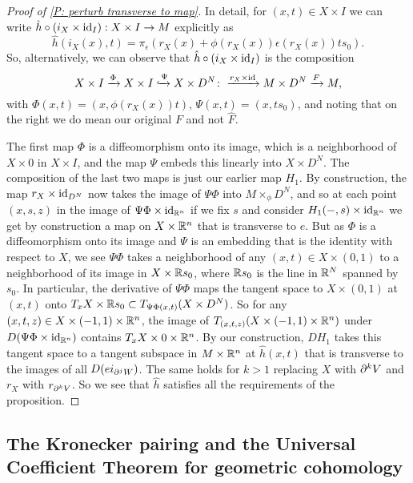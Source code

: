 \begin{proof}[Proof of \cref{P: perturb transverse to map}]
In detail, for $(x,t) \in X \times I$ we can write $\hat h \circ (i_X \times \mathrm{id}_I):X \times I \to M$ explicitly as
$$\hat h(i_X(x),t) = \pi_\epsilon(r_X(x)+\phi(r_X(x))\epsilon(r_X(x))ts_0).$$
So, alternatively, we can observe that $\hat h \circ (i_X \times \mathrm{id}_I)$ is the composition
\begin{equation}\label{E: alt hat g}
X \times I \xrightarrow{\Phi} X \times I \xhookrightarrow{\Psi} X \times D^N\colon\xrightarrow{r_X \times \mathrm{id}} M \times D^N \xrightarrow{F} M,
\end{equation}
with $\Phi(x,t) = (x,\phi(r_X(x))t)$, $\Psi(x,t) = (x,ts_0)$, and noting that on the right we do mean our original $F$ and not $\hat F$.

The first map $\Phi$ is a diffeomorphism onto its image, which is a neighborhood of $X \times 0$ in $X \times I$, and the map $\Psi$ embeds this linearly into $X \times D^N$. The composition of the last two maps is just our earlier map $H_1$. By construction, the map $r_X \times \mathrm{id}_{D^N}$ now takes the image of $\Psi\Phi$ into $M\times_\phi D^N$, and so at each point $(x,s,z)$ in the image of $\Psi\Phi \times \mathrm{id}_{\mathbb{R}^n}$ if we fix $s$ and consider $H_1(-,s)\times\mathrm{id}_{\mathbb{R}^n}$ we get by construction a map on $X \times \mathbb{R}^n$ that is transverse to $e$. But as $\Phi$ is a diffeomorphism onto its image and $\Psi$ is an embedding that is the identity with respect to $X$, we see $\Psi\Phi$ takes a neighborhood of any $(x,t) \in X \times (0,1)$ to a neighborhood of its image in $X \times \mathbb{R} s_0$, where $\mathbb{R} s_0$ is the line in $\mathbb{R}^N$ spanned by $s_0$. In particular, the derivative of $\Psi\Phi$ maps the tangent space to $X \times (0,1)$ at $(x,t)$ onto $ T_xX \times \mathbb{R} s_0 \subset T_{\Psi\Phi(x,t)}(X \times D^N)$. So for any $(x,t,z) \in X \times (-1,1) \times \mathbb{R}^n$, the image of $T_{(x,t,z)}(X \times (-1,1) \times \mathbb{R}^n)$ under
$D(\Psi\Phi \times \mathrm{id}_{\mathbb{R}^n})$ contains $T_xX \times 0 \times \mathbb{R}^n$. By our construction, $DH_1$ takes this tangent space to a tangent subspace in $M \times \mathbb{R}^n$ at $\hat h(x,t)$ that is transverse to the images of all $D(ei_{\partial^jW})$. The same holds for $k>1$ replacing $X$ with $\partial^{k}V$ and $r_X$ with $r_{\partial^{k}V}$. So we see that $\hat h$ satisfies all the requirements of the proposition.
\end{proof}







\subsection{The Kronecker pairing and the Universal Coefficient Theorem for geometric cohomology}

